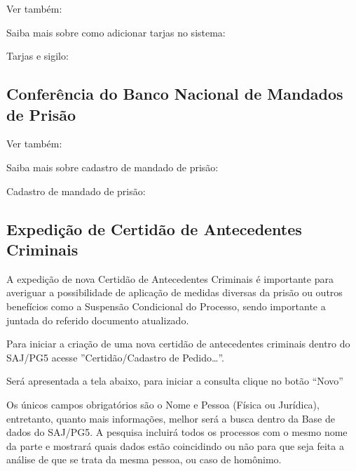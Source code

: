 \documentclass[letterpaper,10pt,brazil]{sphinxmanual}
\begin{document}
\begin{sphinxseealso}{Ver também:}

\sphinxAtStartPar
Saiba mais sobre como adicionar tarjas no sistema:

\sphinxAtStartPar
Tarjas e sigilo: {\hyperref[\detokenize{projud_13_alterarsigilo::doc}]{}}


\end{sphinxseealso}



\subsection{Conferência do Banco Nacional de Mandados de Prisão}
\label{\detokenize{01processos_entrados:conferencia-do-banco-nacional-de-mandados-de-prisao}}

\begin{sphinxseealso}{Ver também:}

\sphinxAtStartPar
Saiba mais sobre cadastro de mandado de prisão:

\sphinxAtStartPar
Cadastro de mandado de prisão: {\hyperref[\detokenize{projud_32_expedicaomandado::doc}]{}}


\end{sphinxseealso}



\subsection{Expedição de Certidão de Antecedentes Criminais}
\label{\detokenize{01processos_entrados:expedicao-de-certidao-de-antecedentes-criminais}}
\sphinxAtStartPar
A expedição de nova Certidão de Antecedentes Criminais é importante para averiguar a possibilidade de aplicação de medidas diversas da prisão ou outros benefícios como a Suspensão Condicional do Processo, sendo importante a juntada do referido documento atualizado.

\sphinxAtStartPar
Para iniciar a criação de uma nova certidão de antecedentes criminais dentro do SAJ/PG5 acesse ”Certidão/Cadastro de Pedido…”.

\sphinxAtStartPar
Será apresentada a tela abaixo, para iniciar a consulta clique no botão “Novo”

\sphinxAtStartPar
Os únicos campos obrigatórios são o Nome e Pessoa (Física ou Jurídica), entretanto, quanto mais informações, melhor será a busca dentro da Base de dados do SAJ/PG5.
A pesquisa incluirá todos os processos com o mesmo nome da parte e mostrará quais dados estão coincidindo ou não para que seja feita a análise de que se trata da mesma pessoa, ou caso de homônimo.
\end{document}
